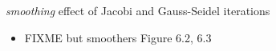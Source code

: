 \documentclass[10pt,
               svgnames,
               hyperref={colorlinks,citecolor=DeepPink4,linkcolor=FireBrick,urlcolor=Maroon},
               usepdftitle=false]{beamer}
\begin{document}
\begin{frame}{\emph{smoothing} effect of Jacobi and Gauss-Seidel iterations}
\begin{itemize}
\item FIXME but smoothers Figure 6.2, 6.3

\end{itemize}
\end{frame}
\end{document}
